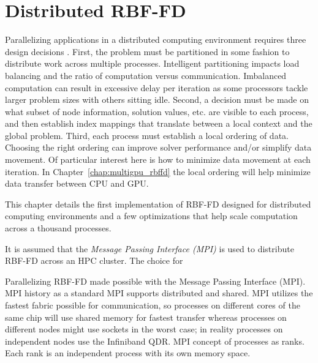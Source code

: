 \documentclass{report}
\begin{document}
\fi


\chapter{Distributed RBF-FD}
\label{chap:distributed_rbffd}



Parallelizing applications in a distributed computing environment requires three
design decisions \cite{Saad2003}. First, the problem must be partitioned in some fashion to distribute work across multiple processes. Intelligent partitioning
impacts load balancing and the ratio of computation versus communication. Imbalanced computation can result in excessive delay per
iteration as some processors tackle larger problem sizes with others sitting idle. Second, a decision must be made on what subset of node information,
solution values, etc. are visible to each process, and then establish index mappings that translate between a local context and the global problem. Third, each process must establish a local ordering of data. Choosing the right ordering can improve solver performance and/or simplify data movement. Of particular interest here is how to minimize data movement at each iteration. In Chapter~\ref{chap:multigpu_rbffd} the local ordering will help minimize data transfer between CPU and GPU. 

This chapter details the first implementation of RBF-FD designed for distributed computing environments and a few optimizations that help scale computation across a thousand processes. 

It is assumed that the \emph{Message Passing Interface (MPI)} \cite{MPI} is used to distribute RBF-FD across an HPC cluster. The choice for 


Parallelizing RBF-FD made possible with the Message Passing Interface (MPI). 
MPI history as a standard
MPI supports distributed and shared. 
MPI utilizes the fastest fabric possible for communication, so processes on different cores of the same chip will use shared memory for fastest transfer whereas processes on different nodes might use sockets in the worst case; in reality processes on independent nodes use the Infiniband QDR. 
MPI concept of processes as ranks. Each rank is an independent process with its own memory space. 


\end{document}
